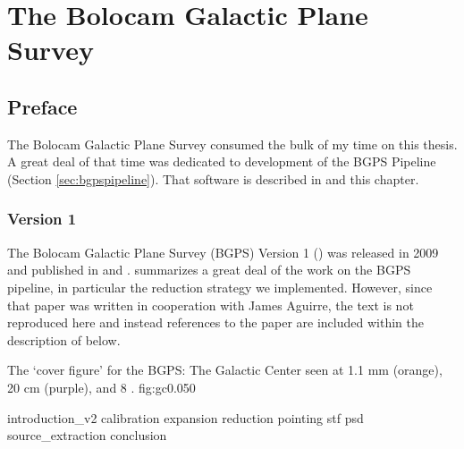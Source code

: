 
\chapter{The Bolocam Galactic Plane Survey}
\label{ch:v2}

\section{Preface}
The Bolocam Galactic Plane Survey consumed the bulk of my time on this thesis.
A great deal of that time was dedicated to development of the BGPS Pipeline
(Section \ref{sec:bgpspipeline}).  That software is described in \citet{Aguirre2011}
and this chapter.

\subsection{Version 1}
The Bolocam Galactic Plane Survey (BGPS) Version 1 (\vone) was released in 2009
and published in \citet{Aguirre2011} and \citet{Rosolowsky2010}.
\citet{Aguirre2011} summarizes a great deal of the work on the BGPS pipeline,
in particular the reduction strategy we implemented.  However, since that paper
was written in cooperation with James Aguirre, the text is not reproduced here
and instead references to the paper are included within the description of
\vtwo below.

{The `cover figure' for the BGPS: The Galactic Center seen at 1.1 mm (orange),
20 cm (purple), and 8 \um.
}{fig:gc}{0.05}{0}

{introduction_v2}
{calibration} %
{expansion}
{reduction} %
{pointing} %
{stf} %
{psd} 
{source_extraction} %
{conclusion}





